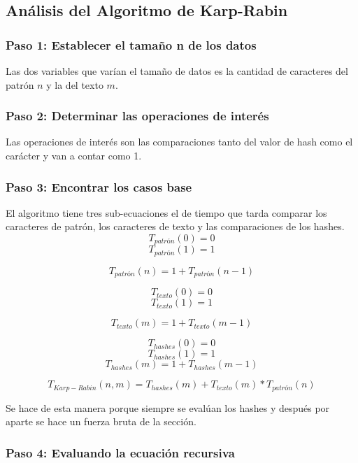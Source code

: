 \subsection*{Análisis del Algoritmo de Karp-Rabin}

\subsubsection*{Paso 1: Establecer el tamaño n de los datos}
Las dos variables que varían el tamaño de datos es la cantidad de caracteres del patrón $n$ y la del texto $m$.

\subsubsection*{Paso 2: Determinar las operaciones de interés}
Las operaciones de interés son las comparaciones tanto del valor de hash como el carácter y van a contar como 1.

\subsubsection*{Paso 3: Encontrar los casos base}
El algoritmo tiene tres sub-ecuaciones el de tiempo que tarda comparar los caracteres de patrón, los caracteres de texto y las comparaciones de los hashes.
\[T_{patrón}(0) =  0\]
\[T_{patrón}(1) = 1\]

\[T_{patrón}(n) = 1 + T_{patrón}(n-1)\]

\[T_{texto}(0) =  0\]
\[T_{texto}(1) = 1\]

\[T_{texto}(m) = 1 + T_{texto}(m-1)\]

\[T_{hashes}(0) = 0\]
\[T_{hashes}(1) = 1\]
\[T_{hashes}(m) = 1 + T_{hashes}(m-1)\]


\[T_{Karp-Rabin}(n,m) = T_{hashes}(m) + T_{texto}(m) * T_{patrón}(n)\]

Se hace de esta manera porque siempre se evalúan los hashes y después por aparte se hace un fuerza bruta de la sección.
\subsubsection*{Paso 4: Evaluando la ecuación recursiva}

